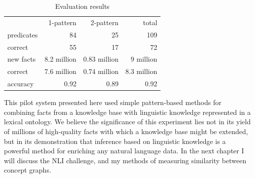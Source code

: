 \begin{table}
	\centering
	\begin{tabular}{lrrr}
		& 1-pattern & 2-pattern & total\\
		predicates  & 84 & 25 & 109 \\
		correct     & 55 & 17 & 72 \\
		new facts   & 8.2 million & 0.83 million & 9 million \\
		correct     & 7.6 million & 0.74 million & 8.3 million \\ 
		accuracy    & 0.92 & 0.89 & 0.92
	\end{tabular}
	\caption{Evaluation results}
	\label{table:results}
\end{table}

This pilot system presented here used simple pattern-based
methods for combining facts from a knowledge base with linguistic knowledge
represented in a lexical ontology. We believe
the significance of this experiment lies not in its yield of millions of high-quality
facts with which a knowledge base might be extended, but in its demonstration
that inference based on linguistic knowledge is a powerful
method for enriching any natural language data. In the next chapter I will discuss the NLI challenge, and my methods of measuring similarity between concept graphs.